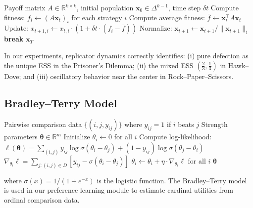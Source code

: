 \documentclass[10pt]{article}
\begin{document}
\begin{algorithm}[H]
\caption{Replicator Dynamics for Population Games}
\label{alg:replicator}
\begin{algorithmic}[1]
\REQUIRE Payoff matrix $A \in \mathbb{R}^{k \times k}$, initial population $\mathbf{x}_0 \in \Delta^{k-1}$, time step $\delta t$
  \STATE Compute fitness: $f_i \leftarrow (A\mathbf{x}_t)_i$ for each strategy $i$
  \STATE Compute average fitness: $\bar{f} \leftarrow \mathbf{x}_t^\top A \mathbf{x}_t$
  \STATE Update: $x_{t+1,i} \leftarrow x_{t,i} \cdot (1 + \delta t \cdot (f_i - \bar{f}))$
  \STATE Normalize: $\mathbf{x}_{t+1} \leftarrow \mathbf{x}_{t+1} / \|\mathbf{x}_{t+1}\|_1$
    \STATE \textbf{break} 
  \ENDIF
\ENDFOR
\RETURN $\mathbf{x}_T$
\end{algorithmic}
\end{algorithm}

In our experiments, replicator dynamics correctly identifies: (i) pure defection as the unique ESS in the Prisoner's Dilemma; (ii) the mixed ESS $(\frac{2}{3}, \frac{1}{3})$ in Hawk--Dove; and (iii) oscillatory behavior near the center in Rock--Paper--Scissors.

\subsection{Bradley--Terry Model}
\label{app:bt}

\begin{algorithm}[H]
\caption{Bradley--Terry Preference Learning}
\label{alg:bt}
\begin{algorithmic}[1]
\REQUIRE Pairwise comparison data $\{(i, j, y_{ij})\}$ where $y_{ij} = 1$ if $i$ beats $j$
\ENSURE Strength parameters $\boldsymbol{\theta} \in \mathbb{R}^m$
\STATE Initialize $\theta_i \leftarrow 0$ for all $i$
  \STATE Compute log-likelihood:
  \STATE $\ell(\boldsymbol{\theta}) = \sum_{(i,j)} y_{ij} \log \sigma(\theta_i - \theta_j) + (1-y_{ij}) \log \sigma(\theta_j - \theta_i)$
  \STATE $\nabla_{\theta_i} \ell = \sum_{j: (i,j) \in D} [y_{ij} - \sigma(\theta_i - \theta_j)]$
  \STATE $\theta_i \leftarrow \theta_i + \eta \cdot \nabla_{\theta_i} \ell$ for all $i$
\ENDFOR
\RETURN $\boldsymbol{\theta}$
\end{algorithmic}
\end{algorithm}

where $\sigma(x) = 1/(1+e^{-x})$ is the logistic function. The Bradley--Terry model is used in our preference learning module to estimate cardinal utilities from ordinal comparison data.
\end{document}
